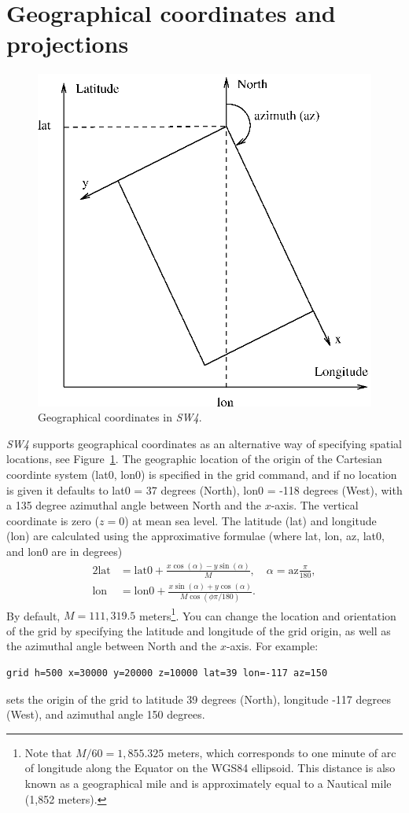 \documentclass[11pt]{report}
\begin{document}
\section{Geographical coordinates and projections}
\begin{figure}
\begin{centering}
  \includegraphics[width=0.6\linewidth]{LatLonAz.ps}
  \caption{Geographical coordinates in \emph{SW4}.}
  \label{fig:geocoord}
\end{centering}
\end{figure}
\emph{SW4} supports geographical coordinates as an alternative way of specifying spatial locations,
see Figure~\ref{fig:geocoord}. The geographic location of the origin of the Cartesian coordinte
system (lat0, lon0) is specified in the grid command, and if no location is given it defaults to
lat0 = 37 degrees (North), lon0 = -118 degrees (West), with a 135 degree azimuthal angle between
North and the $x$-axis. The vertical coordinate is zero ($z=0$) at mean sea level. The latitude (lat)
and longitude (lon) are calculated using the approximative formulae (where lat, lon, az, lat0, and
lon0 are in degrees)
\begin{alignat}{2}
\mbox{lat} &= \mbox{lat0} + \frac{x\cos(\alpha) - y\sin(\alpha)}{M},\quad \alpha =
\mbox{az}\frac{\pi}{180}, \label{eq:lat}\\
\mbox{lon} &= \mbox{lon0} + \frac{x\sin(\alpha ) + y\cos(\alpha)}{M\cos(\phi \pi/180)}.\label{eq:lon}
\end{alignat}
By default, $M = 111,319.5$ meters\footnote{Note that $M/60 = 1,855.325$ meters, which corresponds
  to one minute of arc of longitude along the Equator on the WGS84 ellipsoid. This distance is also
  known as a geographical mile and is approximately equal to a Nautical mile (1,852 meters).}.  You
can change the location and orientation of the grid by specifying the latitude and longitude of the
grid origin, as well as the azimuthal angle between North and the $x$-axis. For example:
\begin{verbatim}
grid h=500 x=30000 y=20000 z=10000 lat=39 lon=-117 az=150
\end{verbatim}
sets the origin of the grid to latitude 39 degrees (North), longitude -117 degrees
(West), and azimuthal angle 150 degrees.
\end{document}
